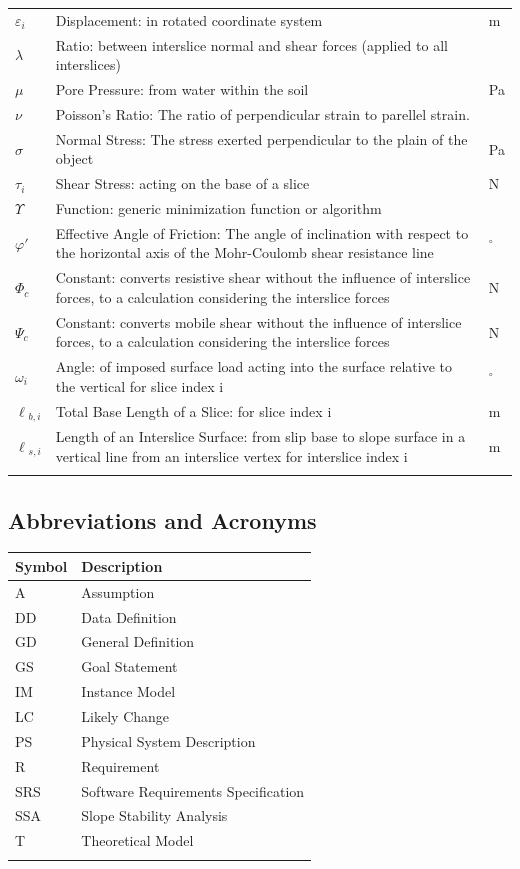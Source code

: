 \documentclass[12pt]{article}
\begin{document}
\begin{longtable*}{l l l}
\\
$\varepsilon{}_{i}$ & Displacement: in rotated coordinate system & m
\\
$\lambda{}$ & Ratio: between interslice normal and shear forces (applied to all interslices) & 
\\
$\mu{}$ & Pore Pressure: from water within the soil & Pa
\\
$\nu{}$ & Poisson's Ratio: The ratio of perpendicular strain to parellel strain. & 
\\
$\sigma{}$ & Normal Stress: The stress exerted perpendicular to the plain of the object & Pa
\\
$\tau{}_{i}$ & Shear Stress: acting on the base of a slice & N
\\
$\Upsilon{}$ & Function: generic minimization function or algorithm & 
\\
$\varphi{}'$ & Effective Angle of Friction: The angle of inclination with respect to the horizontal axis of the Mohr-Coulomb shear resistance line & ${}^{\circ}$
\\
$\Phi{}_{c}$ & Constant: converts resistive shear without the influence of interslice forces, to a calculation considering the interslice forces & N
\\
$\Psi{}_{c}$ & Constant: converts mobile shear without the influence of interslice forces, to a calculation considering the interslice forces & N
\\
$\omega{}_{i}$ & Angle: of imposed surface load acting into the surface relative to the vertical for slice index i & ${}^{\circ}$
\\
$\ell{}_{b,i}$ & Total Base Length of a Slice: for slice index i & m
\\
$\ell{}_{s,i}$ & Length of an Interslice Surface: from slip base to slope surface in a vertical line from an interslice vertex for interslice index i & m
\\
\bottomrule
\label{Table:TablofSymb}
\end{longtable*}
\subsection{Abbreviations and Acronyms}
\label{Sec:AbbrandAcro}
\begin{longtable*}{l l}
\toprule
Symbol & Description
\\
\midrule
A & Assumption
\\
DD & Data Definition
\\
GD & General Definition
\\
GS & Goal Statement
\\
IM & Instance Model
\\
LC & Likely Change
\\
PS & Physical System Description
\\
R & Requirement
\\
SRS & Software Requirements Specification
\\
SSA & Slope Stability Analysis
\\
T & Theoretical Model
\\
\bottomrule
\label{Table:AbbrandAcro}
\end{longtable*}
\end{document}

